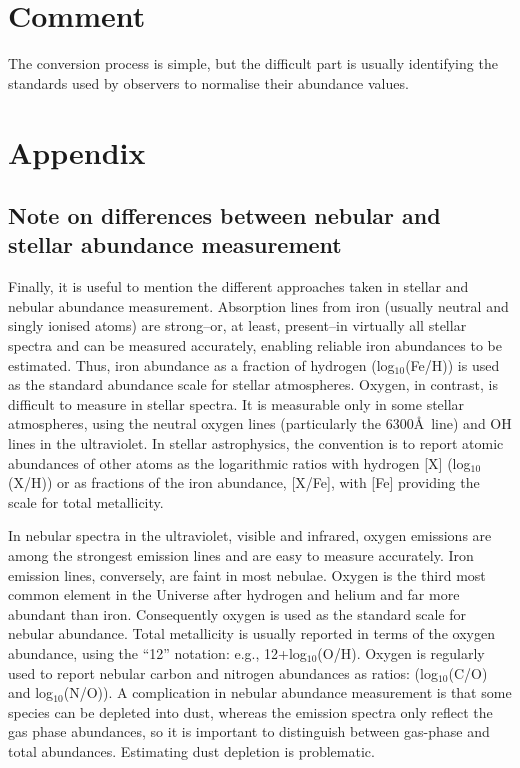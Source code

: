 \section{Comment}
The conversion process is simple, but the difficult part is usually identifying the standards used by observers to normalise their abundance values.

\section{Appendix}
\subsection{Note on differences between nebular and stellar abundance measurement}
Finally, it is useful to mention the different approaches taken in stellar and nebular abundance measurement. Absorption lines from iron (usually neutral and singly ionised atoms) are strong--or, at least, present--in virtually all stellar spectra and can be measured accurately, enabling reliable iron abundances to be estimated. Thus, iron abundance as a fraction of hydrogen (log$_{10}$(Fe/H)) is used as the standard abundance scale for stellar atmospheres. Oxygen, in contrast, is difficult to measure in stellar spectra. It is measurable only in some stellar atmospheres, using the neutral oxygen lines (particularly the 6300\AA\ line) and OH lines in the ultraviolet.  In stellar astrophysics, the convention is to report atomic abundances of other atoms as the logarithmic ratios with hydrogen [X] (log$_{10}$(X/H)) or as fractions of the iron abundance, [X/Fe], with [Fe] providing the scale for total metallicity.

In nebular spectra in the ultraviolet, visible and infrared, oxygen emissions are among the strongest emission lines and are easy to measure accurately. Iron emission lines, conversely, are faint in most nebulae.  Oxygen is the third most common element in the Universe after hydrogen and helium and far more abundant than iron. Consequently oxygen is used as the standard scale for nebular abundance. Total metallicity is usually reported in terms of the oxygen abundance, using the ``12'' notation: e.g., 12+log$_{10}$(O/H). Oxygen is regularly used to report nebular carbon and nitrogen abundances as ratios: (log$_{10}$(C/O) and log$_{10}$(N/O)). A complication in nebular abundance measurement is that some species can be depleted into dust, whereas the emission spectra only reflect the gas phase abundances, so it is important to distinguish between gas-phase and total abundances. Estimating dust depletion is problematic.


